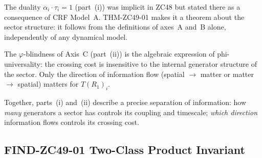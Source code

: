 \documentclass[12pt, a4paper]{article}
\begin{document}
\begin{derivedbox}[title={Commentary on THM-ZC49-01}]
The duality $\alpha_i\cdot\tau_i = 1$ (part~(i)) was implicit
in ZC48 but stated there as a consequence of CRF Model~A.
THM-ZC49-01 makes it a theorem about the sector structure:
it follows from the definitions of axes~A and~B alone,
independently of any dynamical model.

The $\varphi$-blindness of Axis~C (part~(ii)) is the algebraic
expression of phi-universality: the crossing cost is insensitive
to the internal generator structure of the sector.
Only the direction of information flow (spatial $\to$ matter
or matter $\to$ spatial) matters for $T(R_1)_i$.

Together, parts~(i) and~(ii) describe a precise separation of
information: how \emph{many} generators a sector has controls
its coupling and timescale; \emph{which direction} information
flows controls its crossing cost.
\end{derivedbox}

\subsection{FIND-ZC49-01 \quad Two-Class Product Invariant}
\label{sec:find01}
\end{document}
